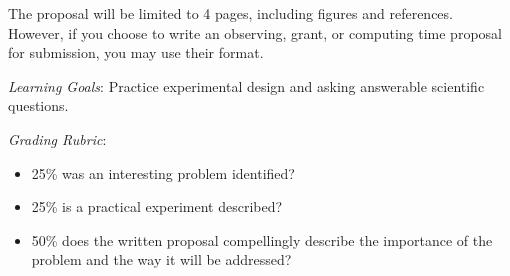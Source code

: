 \documentclass{article}
\begin{document}
The proposal will be limited to 4 pages, including figures and references.
However, if you choose to write an observing, grant, or computing time proposal
for submission, you may use their format.

\textit{Learning Goals}:
    Practice experimental design and asking answerable scientific questions.

\textit{Grading Rubric}:
\begin{itemize}
    \item 25\% was an interesting problem identified?
    \item 25\% is a practical experiment described?
    \item 50\% does the written proposal compellingly describe the importance of the problem and the way it will be addressed?
\end{itemize}


\clearpage
\end{document}
